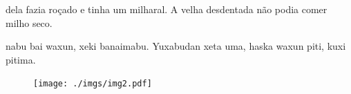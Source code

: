 

 dela fazia roçado e tinha
um milharal. A velha desdentada
não podia comer milho seco.

\vspace{2em}

 nabu bai waxun, xeki
banaimabu. Yuxabudan xeta uma,
haska waxun piti, kuxi pitima.

\vspace*{\fill}

\pagebreak
\thispagestyle{empty}
\begin{figure}
\vspace*{-.5cm}
\hspace*{-2.2cm}\texttt{[image: ./imgs/img2.pdf]}
\end{figure}

\chapter*{}

\vspace*{-\baselineskip}


